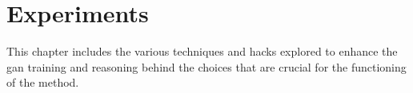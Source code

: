 \chapter{Experiments}
\label{chap:experiments}
This chapter includes the various techniques and hacks explored to enhance the \ac{gan} training and reasoning behind the choices that are crucial for the functioning of the method.%





